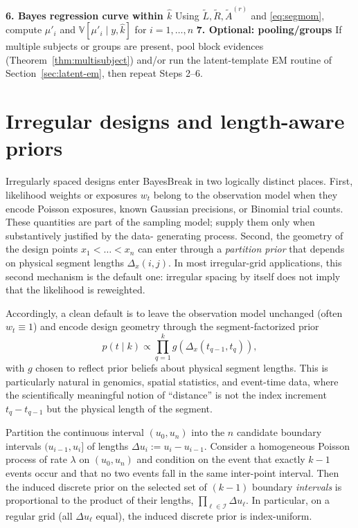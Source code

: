 \begin{algorithm}[H]
\For{$q=1$ \KwTo $\widehat{k}$}{
  Let $(i,j]\leftarrow (\widehat{t}^{\,\mathrm{MAP}}_{q-1},\widehat{t}^{\,\mathrm{MAP}}_{q}]$\;
  For $r\in\{1,2\}$ set $\widehat{\mu}^{(r)}_q \leftarrow \widetilde{A}^{(r)}_{ij}/\widetilde{A}^{(0)}_{ij}$ (cf.\ \eqref{eq:segmom-seg})\;
}
\BlankLine
\textbf{6. Bayes regression curve within $\widehat{k}$}\;
Using $\widetilde{L},\widetilde{R},\widetilde{A}^{(r)}$ and \eqref{eq:segmom}, compute $\widehat{\mu}'_i$ and $\mathbb{V}[\mu'_i\mid y,\widehat{k}]$ for $i=1,\dots,n$\;
\BlankLine
\textbf{7. Optional: pooling/groups}\;
If multiple subjects or groups are present, pool block evidences (Theorem~\ref{thm:multisubject}) and/or run the latent-template EM routine of Section~\ref{sec:latent-em}, then repeat Steps 2--6.
\end{algorithm}

\section{Irregular designs and length-aware priors}
\label{sec:irregular}

Irregularly spaced designs enter BayesBreak in two logically distinct places.
First, likelihood weights or exposures $w_t$ belong to the observation model when they encode
Poisson exposures, known Gaussian precisions, or Binomial trial counts. These quantities are
part of the sampling model; supply them only when substantively justified by the data-
generating process. Second, the geometry of the design points $x_1<\dots<x_n$ can enter through
a \emph{partition prior} that depends on physical segment lengths $\Delta_x(i,j)$. In most irregular-grid
applications, this second mechanism is the default one: irregular spacing by itself does not imply
that the likelihood is reweighted.

Accordingly, a clean default is to leave the observation model unchanged (often $w_t\equiv 1$) and
encode design geometry through the segment-factorized prior
\[
p(t\mid k) \propto \prod_{q=1}^k g(\Delta_x(t_{q-1},t_q)),
\]
with $g$ chosen to reflect prior beliefs about physical segment lengths. This is particularly natural
in genomics, spatial statistics, and event-time data, where the scientifically meaningful notion of
``distance'' is not the index increment $t_q-t_{q-1}$ but the physical length of the segment.

\begin{proposition}
\label{prop:pp-index-uniform}
Partition the continuous interval $(u_0,u_n)$ into the $n$ candidate boundary intervals
$(u_{i-1},u_i]$ of lengths $\Delta u_i:=u_i-u_{i-1}$. Consider a homogeneous Poisson process
of rate $\lambda$ on $(u_0,u_n)$ and condition on the event that exactly $k-1$ events occur
and that no two events fall in the same inter-point interval. Then the induced discrete prior
on the selected set of $(k-1)$ boundary \emph{intervals} is proportional to the product of
their lengths, $\prod_{\ell\in\mathcal{I}} \Delta u_\ell$. In particular, on a regular grid
(all $\Delta u_\ell$ equal), the induced discrete prior is index-uniform.
\end{proposition}

